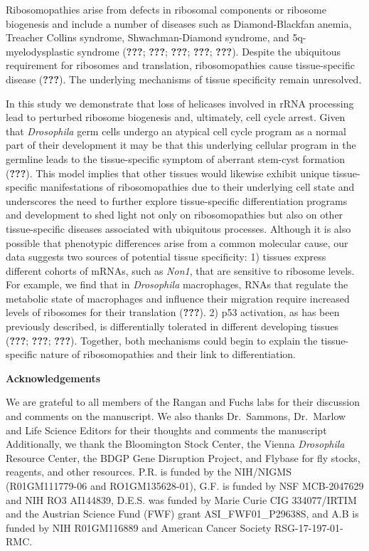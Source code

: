 \documentclass[12pt,oneside]{reedthesis}
\begin{document}
Ribosomopathies arise from defects in ribosomal components or ribosome biogenesis and include a number of diseases such as Diamond-Blackfan anemia, Treacher Collins syndrome, Shwachman-Diamond syndrome, and 5q-myelodysplastic syndrome ({\textbf{???}}; {\textbf{???}}; {\textbf{???}}; {\textbf{???}}; {\textbf{???}}). Despite the ubiquitous requirement for ribosomes and translation, ribosomopathies cause tissue-specific disease ({\textbf{???}}). The underlying mechanisms of tissue specificity remain unresolved.

In this study we demonstrate that loss of helicases involved in rRNA processing lead to perturbed ribosome biogenesis and, ultimately, cell cycle arrest. Given that \emph{Drosophila} germ cells undergo an atypical cell cycle program as a normal part of their development it may be that this underlying cellular program in the germline leads to the tissue-specific symptom of aberrant stem-cyst formation ({\textbf{???}}). This model implies that other tissues would likewise exhibit unique tissue-specific manifestations of ribosomopathies due to their underlying cell state and underscores the need to further explore tissue-specific differentiation programs and development to shed light not only on ribosomopathies but also on other tissue-specific diseases associated with ubiquitous processes. Although it is also possible that phenotypic differences arise from a common molecular cause, our data suggests two sources of potential tissue specificity: 1) tissues express different cohorts of mRNAs, such as \emph{Non1}, that are sensitive to ribosome levels. For example, we find that in \emph{Drosophila} macrophages, RNAs that regulate the metabolic state of macrophages and influence their migration require increased levels of ribosomes for their translation ({\textbf{???}}). 2) p53 activation, as has been previously described, is differentially tolerated in different developing tissues ({\textbf{???}}; {\textbf{???}}; {\textbf{???}}). Together, both mechanisms could begin to explain the tissue-specific nature of ribosomopathies and their link to differentiation.

\textbf{Acknowledgements}

We are grateful to all members of the Rangan and Fuchs labs for their discussion and comments on the manuscript. We also thanks Dr.~Sammons, Dr.~Marlow and Life Science Editors for their thoughts and comments the manuscript Additionally, we thank the Bloomington Stock Center, the Vienna \emph{Drosophila} Resource Center, the BDGP Gene Disruption Project, and Flybase for fly stocks, reagents, and other resources. P.R. is funded by the NIH/NIGMS (R01GM111779-06 and RO1GM135628-01), G.F. is funded by NSF MCB-2047629 and NIH RO3 AI144839, D.E.S. was funded by Marie Curie CIG 334077/IRTIM and the Austrian Science Fund (FWF) grant ASI\_FWF01\_P29638S, and A.B is funded by NIH R01GM116889 and American Cancer Society RSG-17-197-01-RMC.
\end{document}
